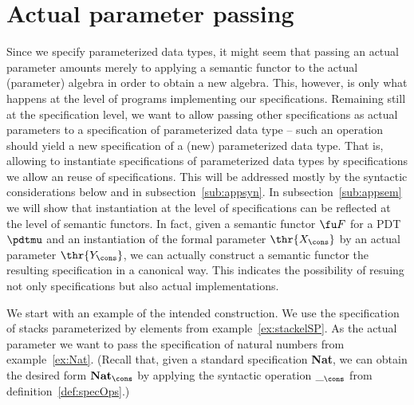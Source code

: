 \section{Actual parameter passing}\label{se:app}
Since we specify parameterized data types, it might seem that passing an
actual parameter amounts merely to applying a semantic functor to the actual (parameter)
algebra in order to obtain a new algebra. This, however, is only what happens
at the level of programs implementing our specifications. Remaining still at
the specification level, we want to allow passing other specifications as
actual parameters to a specification of parameterized data type -- 
such an operation should yield a new specification of a (new) parameterized
data type. That is, allowing to instantiate specifications of parameterized
data types by specifications we allow an reuse of specifications. This will
be addressed mostly by the syntactic considerations below and in
subsection~\ref{sub:appsyn}. In subsection~\ref{sub:appsem} we will show that
instantiation at the level of specifications can be reflected at the level of
semantic functors. In fact, given a semantic functor $\fu F$ for a PDT $\pdtmu$ and
an instantiation of the formal parameter $\thr{X_\cons}$ by an actual
parameter $\thr{Y_\cons}$, we can actually construct a semantic functor the
resulting specification in a canonical way. This indicates the possibility of
resuing not only specifications but also actual implementations. 

We start with an example of the intended construction. We use
the specification of stacks parameterized by elements from example~\ref{ex:stackelSP}.
As the actual parameter we want to pass the specification of natural
numbers
from example~\ref{ex:Nat}.
(Recall that, given a standard specification {\bf Nat}, we can obtain the
desired form ${\bf Nat}_\cons$ by applying the syntactic operation $\__\cons$
from definition~\ref{def:specOps}.)

